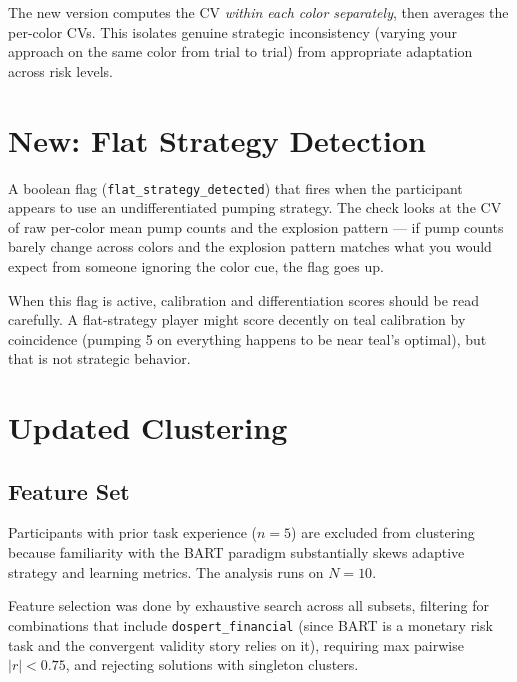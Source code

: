 \documentclass[11pt,a4paper]{article}
\begin{document}
The new version computes the CV \emph{within each color separately}, then
averages the per-color CVs. This isolates genuine strategic inconsistency
(varying your approach on the same color from trial to trial) from
appropriate adaptation across risk levels.


\section{New: Flat Strategy Detection}

A boolean flag (\texttt{flat\_strategy\_detected}) that fires when the
participant appears to use an undifferentiated pumping strategy. The check
looks at the CV of raw per-color mean pump counts and the explosion pattern
--- if pump counts barely change across colors and the explosion pattern
matches what you would expect from someone ignoring the color cue, the flag
goes up.

When this flag is active, calibration and differentiation scores should be
read carefully. A flat-strategy player might score decently on teal
calibration by coincidence (pumping 5 on everything happens to be near
teal's optimal), but that is not strategic behavior.


\section{Updated Clustering}

\subsection{Feature Set}

Participants with prior task experience ($n = 5$) are excluded from
clustering because familiarity with the BART paradigm substantially skews
adaptive strategy and learning metrics. The analysis runs on $N = 10$.

Feature selection was done by exhaustive search across all subsets,
filtering for combinations that include \texttt{dospert\_financial} (since
BART is a monetary risk task and the convergent validity story relies on
it), requiring max pairwise $|r| < 0.75$, and rejecting solutions with
singleton clusters.
\end{document}
